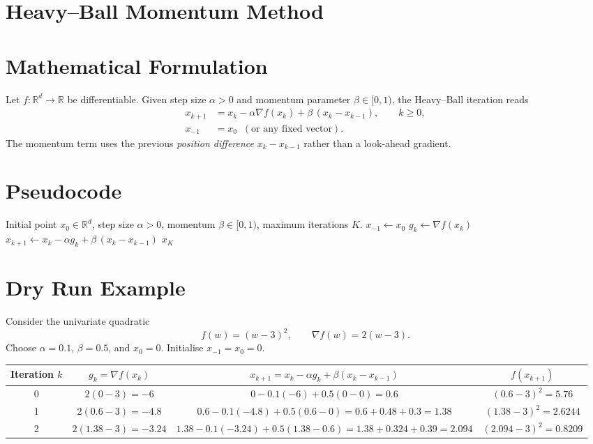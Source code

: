 \documentclass{article}
\newcommand{\R}{\mathbb{R}}
\begin{document}
\section*{Heavy–Ball Momentum Method}

\section*{Mathematical Formulation}
Let $f:\R^{d}\to\R$ be differentiable.  Given step size $\alpha>0$ and momentum parameter $\beta\in[0,1)$,
the Heavy–Ball iteration reads
\[
\boxed{
\begin{aligned}
x_{k+1}&=x_{k}-\alpha \nabla f(x_{k})+\beta\,(x_{k}-x_{k-1}),\qquad k\ge 0,\\
x_{-1}&=x_{0}\;\;(\text{or any fixed vector}).
\end{aligned}}
\tag{HB}
\]
The momentum term uses the previous \emph{position difference} $x_{k}-x_{k-1}$ rather than a look‑ahead gradient.

\section*{Pseudocode}
\begin{algorithm}[H]
\caption{Heavy–Ball Momentum}
\begin{algorithmic}[1]
\Require Initial point $x_{0}\in\R^{d}$, step size $\alpha>0$, momentum $\beta\in[0,1)$,
maximum iterations $K$.
\State $x_{-1}\gets x_{0}$ 
    \State $g_{k}\gets \nabla f(x_{k})$
    \State $x_{k+1}\gets x_{k}-\alpha g_{k}+\beta\,(x_{k}-x_{k-1})$
\EndFor
\State \Return $x_{K}$
\end{algorithmic}
\end{algorithm}

\section*{Dry Run Example}
Consider the univariate quadratic
\[
f(w)=(w-3)^{2},\qquad \nabla f(w)=2(w-3).
\]
Choose $\alpha=0.1$, $\beta=0.5$, and $x_{0}=0$.  Initialise $x_{-1}=x_{0}=0$.

\begin{tabular}{c|c|c|c}
Iteration $k$ & $g_{k}= \nabla f(x_{k})$ & $x_{k+1}=x_{k}-\alpha g_{k}+\beta(x_{k}-x_{k-1})$ & $f(x_{k+1})$\\\hline
0 & $2(0-3)=-6$ & $0-0.1(-6)+0.5(0-0)=0.6$ & $(0.6-3)^{2}=5.76$\\
1 & $2(0.6-3)=-4.8$ & $0.6-0.1(-4.8)+0.5(0.6-0)=0.6+0.48+0.3=1.38$ & $(1.38-3)^{2}=2.6244$\\
2 & $2(1.38-3)=-3.24$ & $1.38-0.1(-3.24)+0.5(1.38-0.6)=1.38+0.324+0.39=2.094$ & $(2.094-3)^{2}=0.8209$
\end{tabular}
\end{document}
